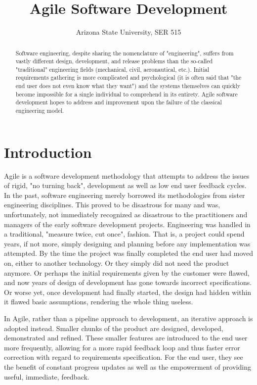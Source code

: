 \documentclass[format=acmsmall, review=false, screen=true, anonymous=True]{acmart}
\begin{document}
\title{Agile Software Development}
\author{Arizona State University, SER 515}



\begin{abstract}
Software engineering, despite sharing the nomenclature of "engineering", suffers from vastly different design, development, and release problems than the so-called "traditional" engineering fields (mechanical, civil, aeronautical, etc.). Initial requirements gathering is more complicated and psychological (it is often said that "the end user does not even know what they want") and the systems themselves can quickly become impossible for a single individual to comprehend in its entirety. Agile software development hopes to address and improvement upon the failure of the classical engineering model.
\end{abstract}


\maketitle

\section{Introduction}
Agile is a software development methodology that attempts to address the issues of rigid, "no turning back", development as well as low end user feedback cycles. In the past, software engineering merely borrowed its methodologies from sister engineering disciplines. This proved to be disastrous for many and was, unfortunately, not immediately recognized as disastrous to the practitioners and managers of the early software development projects. Engineering was handled in a traditional, "measure twice, cut once", fashion. That is, a project could spend years, if not more, simply designing and planning before any implementation was attempted. By the time the project was finally completed the end user had moved on, either to another technology. Or they simply did not need the product anymore. Or perhaps the initial requirements given by the customer were flawed, and now years of design of development has gone towards incorrect specifications. Or worse yet, once development had finally started, the design had hidden within it flawed basic assumptions, rendering the whole thing useless.

In Agile, rather than a pipeline approach to development, an iterative approach is adopted instead. Smaller chunks of the product are designed, developed, demonstrated and refined. These smaller features are introduced to the end user more frequently, allowing for a more rapid feedback loop and thus faster error correction with regard to requirements specification. For the end user, they see the benefit of constant progress updates as well as the empowerment of providing useful, immediate, feedback.
\end{document}
